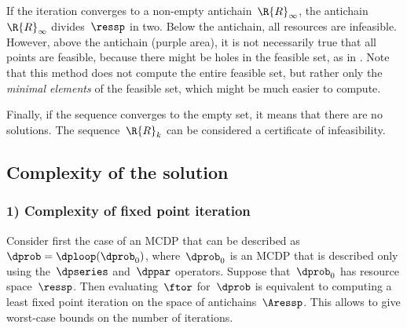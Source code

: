 If the iteration converges to a non-empty antichain~$\R{R}_{\infty}$,
the antichain~$\R{R}_{\infty}$ divides~$\ressp$ in two. Below
the antichain, all resources are infeasible. However, above the antichain
(purple area), it is not necessarily true that all points are feasible,
because there might be holes in the feasible set, as in .
Note that this method does not compute the entire feasible set, but
rather only the \emph{minimal elements} of the feasible set, which
might be much easier to compute.

Finally, if the sequence converges to the empty set, it means that
there are no solutions. The sequence~$\R{R}_{k}$ can be considered
a certificate of infeasibility.

\subsection{Complexity of the solution }


\subsubsection*{1) Complexity of fixed point iteration}

Consider first the case of an MCDP that can be described as~$\dprob=\dploop(\dprob_{0})$,
where~$\dprob_{0}$ is an MCDP that is described only using the~$\dpseries$
and~$\dppar$ operators. Suppose that~$\dprob_{0}$ has resource
space~$\ressp$. Then evaluating~$\ftor$ for~$\dprob$ is equivalent
to computing a least fixed point iteration on the space of antichains~$\Aressp$.
This allows to give worst-case bounds on the number of iterations.

